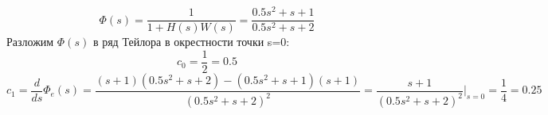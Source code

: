 \documentclass[a4paper, 12pt]{article}
\begin{document}
\begin{equation}
\varPhi(s) = \frac{1}{{1 + H(s)W(s)}} = \frac{{0.5{s^2} + s + 1}}{{0.5{s^2} + s + 2}}
\end{equation}
Разложим $\varPhi(s)$ в ряд Тейлора в окрестности точки s=0:
\[{c_0} = \frac{1}{2} = 0.5\]
\[{c_1} = \frac{d}{{ds}}{\Phi _e}(s) = \frac{{(s + 1)(0.5{s^2} + s + 2) - (0.5{s^2} + s + 1)(s + 1)}}{{{{(0.5{s^2} + s + 2)}^2}}} = \frac{{s + 1}}{{{{(0.5{s^2} + s + 2)}^2}}}{|_{s = 0}} = \frac{1}{4} = 0.25\]
\end{document}
